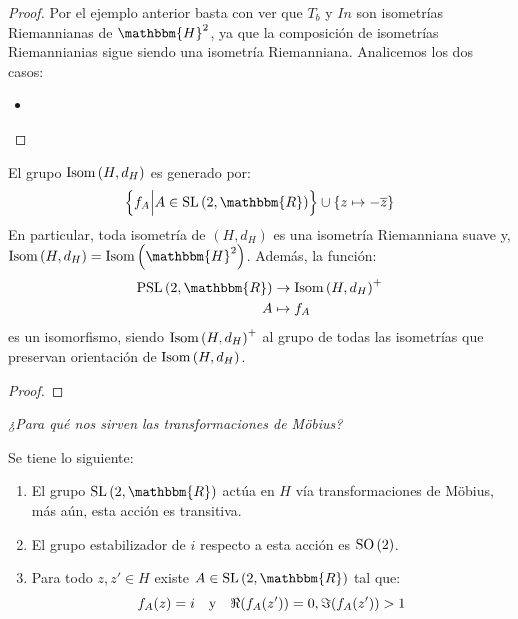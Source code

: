 \documentclass[12pt]{report}
\theoremstyle{largebreak}
\newcommand{\bbm}[1]{\ensuremath{\mathbbm{#1}}}
\newcommand{\Isom}[1]{\ensuremath{\textup{Isom}\left(#1\right)}}
\newcommand{\SO}[1]{\ensuremath{\textup{SO}\left(#1\right)}}
\newcommand{\SL}[1]{\ensuremath{\textup{SL}\left(#1\right)}}
\newcommand{\PSL}[1]{\ensuremath{\textup{PSL}\left(#1\right)}}
\begin{document}
    \begin{proof}
        Por el ejemplo anterior basta con ver que $T_b$ y $In$ son isometrías Riemannianas de $\bbm{H}^2$, ya que la composición de isometrías Riemannianias sigue siendo una isometría Riemanniana. Analicemos los dos casos:
        \begin{itemize}
            \item 
        \end{itemize}
    \end{proof}

    \begin{theor}
        El grupo $\Isom{H,d_H}$ es generado por:
        \begin{equation*}
            \left\{f_A\Big|A\in\SL{2,\bbm{R}} \right\}\cup\left\{z\mapsto-\overline{z} \right\}
        \end{equation*}
        En particular, toda isometría de $(H,d_H)$ es una isometría Riemanniana suave y, $\Isom{H,d_H}=\Isom{\bbm{H}^2}$. Además, la función:
        \begin{equation*}
            \begin{split}
                \PSL{2,\bbm{R}}&\rightarrow\Isom{H,d_H}^+\\
                A&\mapsto f_A\\
            \end{split}
        \end{equation*}
        es un isomorfismo, siendo $\Isom{H,d_H}^+$ al grupo de todas las isometrías que preservan orientación de $\Isom{H,d_H}$.
    \end{theor}

    \begin{proof}
    \end{proof}

    \begin{center}
        \textit{¿Para qué nos sirven las transformaciones de Möbius?}
    \end{center}

    \begin{propo}[\textbf{Acción de $\SL{2,\bbm{R}}$ en $H$}]
        \label{accionSL2RenH}
        Se tiene lo siguiente:
        \begin{enumerate}[label = \textit{(\arabic*)}]
            \item El grupo $\SL{2,\bbm{R}}$ actúa en $H$ vía transformaciones de Möbius, más aún, esta acción es transitiva.
            \item El grupo estabilizador de $i$ respecto a esta acción es $\SO{2}$.
            \item Para todo $z,z'\in H$ existe $A\in\SL{2,\bbm{R}}$ tal que:
            \begin{equation*}
                f_A(z)=i\quad\textup{y}\quad\Re(f_A(z'))=0, \Im(f_A(z'))>1
            \end{equation*}
        \end{enumerate}
    \end{propo}
\end{document}
